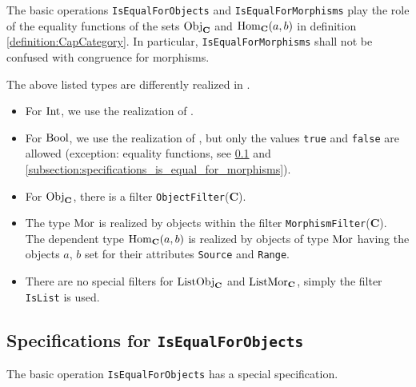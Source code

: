 \begin{remark}
 The basic operations \texttt{IsEqualForObjects} and \texttt{IsEqualForMorphisms} play the role
 of the equality functions of the sets $\mathrm{Obj}_{\mathbf{C}}$ and $\operatorname{\mathrm{Hom}}_{\mathbf{C}}(a,b)$ in definition
 \ref{definition:CapCategory}. In particular, \texttt{IsEqualForMorphisms} shall not be confused
 with congruence for morphisms.
\end{remark}

\begin{remark}\label{remark:realization_of_types}
 The above listed types are differently realized in \CapPkg.
 \begin{itemize}
  \item For $\mathrm{Int}$, we use the realization of \GAP.
  \item For $\mathrm{Bool}$, we use the realization of \GAP, but only the values \texttt{true} and \texttt{false}
  are allowed (exception: equality functions, see \ref{subsection:specifications_is_equal_for_objects} and \ref{subsection:specifications_is_equal_for_morphisms}).
  \item For $\mathrm{Obj}_{\mathbf{C}}$, there is a \GAP filter \texttt{ObjectFilter}($\mathbf{C}$).
  \item The type $\mathrm{Mor}$ is realized by \GAP objects within the filter \texttt{MorphismFilter}($\mathbf{C}$). 
  The dependent type $\operatorname{\mathrm{Hom}}_{\mathbf{C}}( a, b )$ is realized by objects of type $\mathrm{Mor}$ having the objects $a$, $b$ set
 for their attributes \texttt{Source} and \texttt{Range}. 
  \item There are no special \GAP filters for $\mathrm{ListObj}_{\mathbf{C}}$ and $\mathrm{ListMor}_{\mathbf{C}}$, simply the \GAP filter \texttt{IsList}
  is used.
\end{itemize}
\end{remark}

\subsection{Specifications for \texttt{IsEqualForObjects}}\label{subsection:specifications_is_equal_for_objects}
The basic operation \texttt{IsEqualForObjects} has a special specification.

